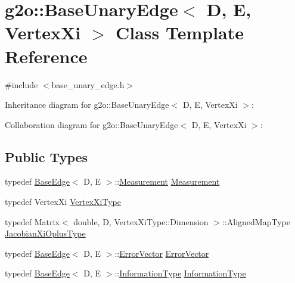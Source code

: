 \hypertarget{classg2o_1_1BaseUnaryEdge}{}\section{g2o\+:\+:Base\+Unary\+Edge$<$ D, E, Vertex\+Xi $>$ Class Template Reference}
\label{classg2o_1_1BaseUnaryEdge}


{\ttfamily \#include $<$base\+\_\+unary\+\_\+edge.\+h$>$}



Inheritance diagram for g2o\+:\+:Base\+Unary\+Edge$<$ D, E, Vertex\+Xi $>$\+:


Collaboration diagram for g2o\+:\+:Base\+Unary\+Edge$<$ D, E, Vertex\+Xi $>$\+:
\subsection*{Public Types}
\begin{DoxyCompactItemize}
\item 
typedef \hyperlink{classg2o_1_1BaseEdge}{Base\+Edge}$<$ D, E $>$\+::\hyperlink{classg2o_1_1BaseEdge_a2c148abba650a20b8c7eed75d3e2211e}{Measurement} \hyperlink{classg2o_1_1BaseUnaryEdge_ab953b076b4c35fcf99de02bd0bfcc1ae}{Measurement}
\item 
typedef Vertex\+Xi \hyperlink{classg2o_1_1BaseUnaryEdge_a503e62e74775172c008135650850d511}{Vertex\+Xi\+Type}
\item 
typedef Matrix$<$ double, D, Vertex\+Xi\+Type\+::\+Dimension $>$\+::Aligned\+Map\+Type \hyperlink{classg2o_1_1BaseUnaryEdge_a24bcabd661223e15b7337f2835310f5e}{Jacobian\+Xi\+Oplus\+Type}
\item 
typedef \hyperlink{classg2o_1_1BaseEdge}{Base\+Edge}$<$ D, E $>$\+::\hyperlink{classg2o_1_1BaseEdge_af5b558dd24e4be2e437563cae4b3550d}{Error\+Vector} \hyperlink{classg2o_1_1BaseUnaryEdge_abc04cfacb65fc72825156f1b3346dd48}{Error\+Vector}
\item 
typedef \hyperlink{classg2o_1_1BaseEdge}{Base\+Edge}$<$ D, E $>$\+::\hyperlink{classg2o_1_1BaseEdge_a2e5a33343ac3f189d8a7d5ee4d8b73fc}{Information\+Type} \hyperlink{classg2o_1_1BaseUnaryEdge_a6753caa95c30fa5bb3887e2a30892ff3}{Information\+Type}
\end{DoxyCompactItemize}
